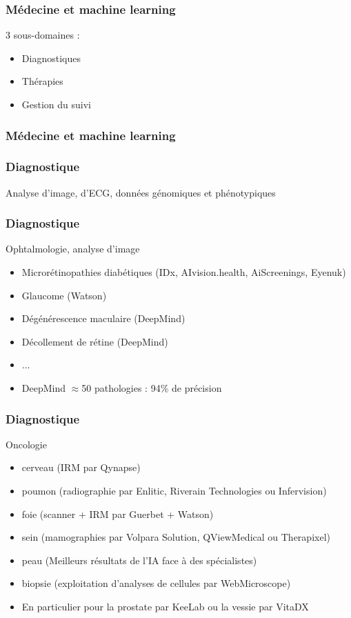 \begin{frame}
  \frametitle{Médecine et machine learning}
  3 sous-domaines :
  \begin{itemize}
  \item Diagnostiques
  \item Thérapies
  \item Gestion du suivi
  \end{itemize}
\end{frame}

\begin{frame}
  \frametitle{Médecine et machine learning}
\end{frame}

\begin{frame}
  \frametitle{Diagnostique}
  Analyse d'image, d'ECG, données génomiques et phénotypiques
\end{frame}

\begin{frame}
  \frametitle{Diagnostique}
  Ophtalmologie, analyse d'image
  \newline
  \newline
  \begin{minipage}[c]{0.65\linewidth}
    \begin{itemize}
    \item Microrétinopathies diabétiques (IDx, AIvision.health, AiScreenings, Eyenuk)
    \item Glaucome (Watson)
    \item Dégénérescence maculaire (DeepMind)
    \item Décollement de rétine (DeepMind)
    \item ...
    \item DeepMind $\approx$50 pathologies : 94\% de précision
    \end{itemize}
  \end{minipage}\hfill
  \begin{minipage}[c]{0.34\linewidth}
  \end{minipage}\hfill
\end{frame}

\begin{frame}
  \frametitle{Diagnostique}
  Oncologie
  \begin{itemize}
  \item cerveau (IRM par Qynapse)
  \item poumon (radiographie par Enlitic, Riverain Technologies ou Infervision)
  \item foie (scanner + IRM par Guerbet + Watson)
  \item sein (mamographies par Volpara Solution, QViewMedical ou Therapixel)
  \item peau (Meilleurs résultats de l'IA face à des spécialistes)
  \item biopsie (exploitation d'analyses de cellules par WebMicroscope)
  \item     En particulier pour la prostate par KeeLab ou la vessie par VitaDX
  \end{itemize}
\end{frame}

